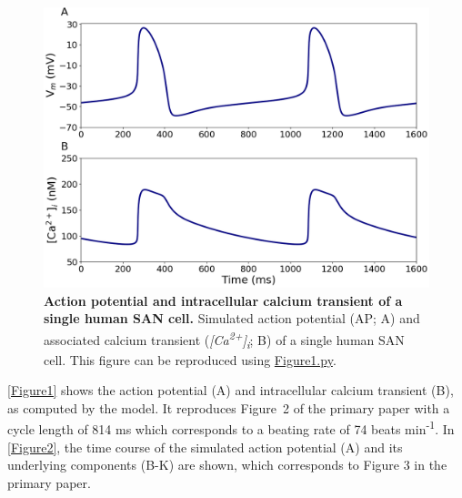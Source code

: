 \documentclass[fleqn,10pt]{physiome}
\begin{document}
\begin{figure}[htb]
\centering
\includegraphics[width=0.7\linewidth]{Figure1}
\caption{\textbf{Action potential and intracellular calcium transient of a single human SAN cell.}\newline
Simulated action potential (AP; A) and associated calcium transient (\textit{[Ca\textsuperscript{2+}]\textsubscript{i}}; B) of a single human SAN cell. This figure can be reproduced using \href{https://models.physiomeproject.org/workspace/648/rawfile/6784d6c3256c832dc98b2db42c85747ae2596518/Figure1.py}{Figure1.py}.}
\label{Figure1}
\end{figure}

\autoref{Figure1} shows the action potential (A) and intracellular calcium transient (B), as computed by the model. It reproduces Figure~2 of the primary paper with a cycle length of 814 ms which corresponds to a beating rate of 74 beats min\textsuperscript{-1}. In \autoref{Figure2}, the time course of the simulated action potential (A) and its underlying components (B-K) are shown, which corresponds to Figure 3 in the primary paper.
\end{document}
